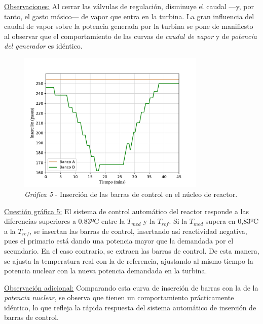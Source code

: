 \underline{Observaciones:} Al cerrar las válvulas de regulación, disminuye el caudal ---y, por tanto, el gasto másico--- de vapor que entra en la turbina. La gran influencia del caudal de vapor sobre la potencia generada por la turbina se pone de manifiesto al observar que el comportamiento de las curvas de \textit{caudal de vapor} y de \textit{potencia del generador} es idéntico.

\begin{figure}[!h]
  \centering
  \includegraphics[width=0.8\textwidth]{content/figures/sim1_barras_control.pdf}
  \caption{\textit{Gráfica 5} - Inserción de las barras de control en el núcleo de reactor.}
  \label{fig:sim1_barras_control}
\end{figure}

\newpage
\underline{Cuestión gráfica 5:} El sistema de control automático del reactor responde a las diferencias superiores a 0.83ºC entre la $T_{med}$ y la $T_{ref}$. Si la $T_{med}$ supera en 0,83ºC a la $T_{ref}$, se insertan las barras de control, insertando así reactividad negativa, pues el primario está dando una potencia mayor que la demandada por el secundario. En el caso contrario, se extraen las barras de control. De esta manera, se ajusta la temperatura real con la de referencia, ajustando al mismo tiempo la potencia nuclear con la nueva potencia demandada en la turbina.

\underline{Observación adicional:} Comparando esta curva de inserción de barras con la de la \textit{potencia nuclear}, se observa que tienen un comportamiento prácticamente idéntico, lo que refleja la rápida respuesta del sistema automático de inserción de barras de control.

